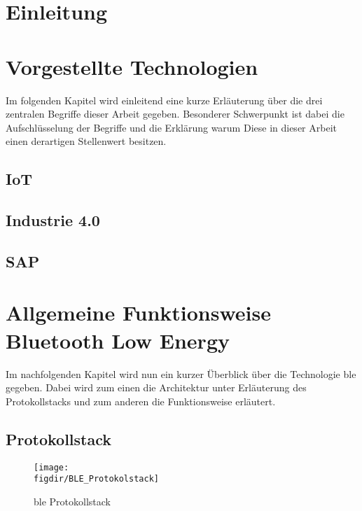 \section{Einleitung}
\label{s:intro}

\section{Vorgestellte Technologien}
\label{s:grundlagen}

Im folgenden Kapitel wird einleitend eine kurze Erläuterung über die drei zentralen Begriffe dieser Arbeit gegeben. Besonderer Schwerpunkt ist dabei die Aufschlüsselung der Begriffe und die Erklärung warum Diese in dieser Arbeit einen derartigen Stellenwert besitzen.\\ 

\subsection{IoT}
\label{ss:grundlagen:beispiele}


\subsection{Industrie 4.0}
\label{ss:grundlagen:hardware}


\subsection{SAP}
\label{ss:grundlagen:frequenz}


\section{Allgemeine Funktionsweise Bluetooth Low Energy}
\label{s:funktionsweise}

\noindent Im nachfolgenden Kapitel wird nun ein kurzer Überblick über die Technologie \ac{ble} gegeben. Dabei wird zum einen die Architektur unter Erläuterung des Protokollstacks und zum anderen die Funktionsweise erläutert.\\   

\subsection{Protokollstack}
\label{ss:funktionsweise:protokollstack}

\begin{figure}[!b]
	\centering
	\texttt{[image: \\figdir/BLE\_Protokolstack]}
	\caption{\ac{ble} Protokollstack \cite[Seite 16]{Townsend14:GSB}}
	\label{FIG:protokollstack}
\end{figure}

